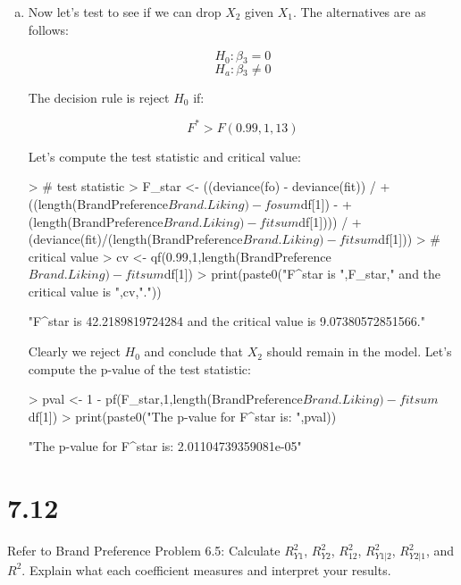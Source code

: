 \documentclass{article}
\begin{document}
\begin{enumerate}[a)]
\item{} Now let's test to see if we can drop $X_2$ given $X_1$. The alternatives are as follows:

$$ H_0: \beta{}_3 = 0 $$
$$ H_a: \beta{}_3 \neq{} 0 $$

The decision rule is reject $H_0$ if:

$$ F^* > F(0.99,1,13) $$

Let's compute the test statistic and critical value:

\begin{Schunk}
\begin{Sinput}
> # test statistic
> F_star <- ((deviance(fo) - deviance(fit)) /
+   ((length(BrandPreference$Brand.Liking) - fosum$df[1]) - 
+      (length(BrandPreference$Brand.Liking) - fitsum$df[1]))) /
+   (deviance(fit)/(length(BrandPreference$Brand.Liking) - fitsum$df[1]))
> # critical value
> cv <- qf(0.99,1,length(BrandPreference$Brand.Liking)-fitsum$df[1])
> print(paste0("F^star is ",F_star," and the critical value is ",cv,"."))
\end{Sinput}
\begin{Soutput}
[1] "F^star is 42.2189819724284 and the critical value is 9.07380572851566."
\end{Soutput}
\end{Schunk}

Clearly we reject $H_0$ and conclude that $X_2$ should remain in the model. Let's compute the p-value of the test statistic:

\begin{Schunk}
\begin{Sinput}
> pval <- 1 - pf(F_star,1,length(BrandPreference$Brand.Liking)-fitsum$df[1])
> print(paste0("The p-value for F^star is: ",pval))
\end{Sinput}
\begin{Soutput}
[1] "The p-value for F^star is: 2.01104739359081e-05"
\end{Soutput}
\end{Schunk}

\end{enumerate}

\section{7.12}

Refer to Brand Preference Problem 6.5: Calculate $R_{Y1}^2$, $R_{Y2}^2$, $R_{12}^2$, $R_{Y1|2}^2$, $R_{Y2|1}^2$, and $R^2$. Explain what each coefficient measures and interpret your results.
\end{document}
